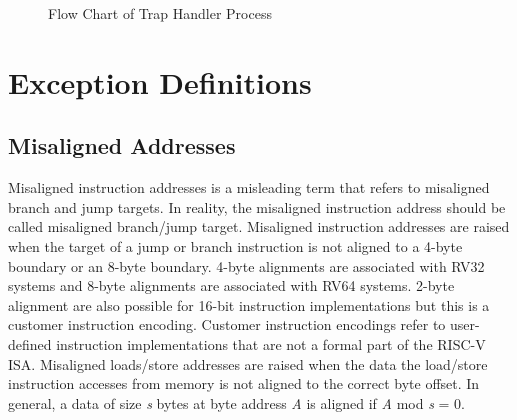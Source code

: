 \documentclass[12pt]{article}
\begin{document}
\begin{figure}
\centering
{}
\caption{Flow Chart of Trap Handler Process}
\end{figure}

\section{Exception Definitions}
\subsection{Misaligned Addresses}
Misaligned instruction addresses is a misleading term that refers to misaligned branch and jump targets. In reality, the misaligned instruction address should be called misaligned branch/jump target. Misaligned instruction addresses are raised when the target of a jump or branch instruction is not aligned to a 4-byte boundary or an 8-byte boundary. 4-byte alignments are associated with RV32 systems and 8-byte alignments are associated with RV64 systems. 2-byte alignment are also possible for 16-bit instruction implementations but this is a customer instruction encoding. Customer instruction encodings refer to user-defined instruction implementations that are not a formal part of the RISC-V ISA. Misaligned loads/store addresses are raised when the data the load/store instruction accesses from memory is not aligned to the correct byte offset. In general, a data of size \emph{s} bytes at byte address \emph{A} is aligned if \emph{A} mod \emph{s} = 0.
\end{document}
